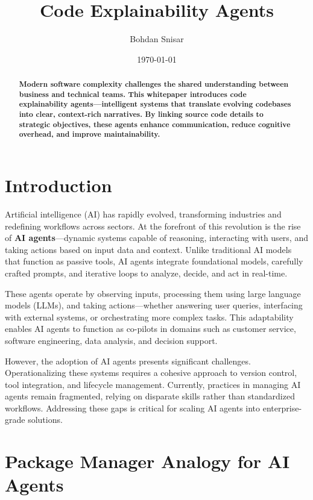 \documentclass[12pt,twocolumn]{article}
\date{\small\today}
\title{%
  Code Explainability Agents \\
  \colorbox{mypink}{\small\sffamily\color{white}{White Paper}}}
\author{Bohdan Snisar}
\begin{document}
\raggedbottom
\maketitle

\begin{abstract}
  \textbf{Modern software complexity challenges the shared understanding between business and technical teams. 
  This whitepaper introduces code explainability agents—intelligent systems that translate evolving codebases 
  into clear, context-rich narratives. By linking source code details to strategic objectives, these agents 
  enhance communication, reduce cognitive overhead, and improve maintainability.}
  \end{abstract}

\section{Introduction}

Artificial intelligence (AI) has rapidly evolved, transforming industries and redefining workflows across sectors. At the forefront of this revolution is the rise of \textbf{AI agents}—dynamic systems capable of reasoning, interacting with users, and taking actions based on input data and context. Unlike traditional AI models that function as passive tools, AI agents integrate foundational models, carefully crafted prompts, and iterative loops to analyze, decide, and act in real-time.

These agents operate by observing inputs, processing them using large language models (LLMs), and taking actions—whether answering user queries, interfacing with external systems, or orchestrating more complex tasks. This adaptability enables AI agents to function as co-pilots in domains such as customer service, software engineering, data analysis, and decision support.

However, the adoption of AI agents presents significant challenges. Operationalizing these systems requires a cohesive approach to version control, tool integration, and lifecycle management. Currently, practices in managing AI agents remain fragmented, relying on disparate skills rather than standardized workflows. Addressing these gaps is critical for scaling AI agents into enterprise-grade solutions.

\section{Package Manager Analogy for AI Agents}
\end{document}

